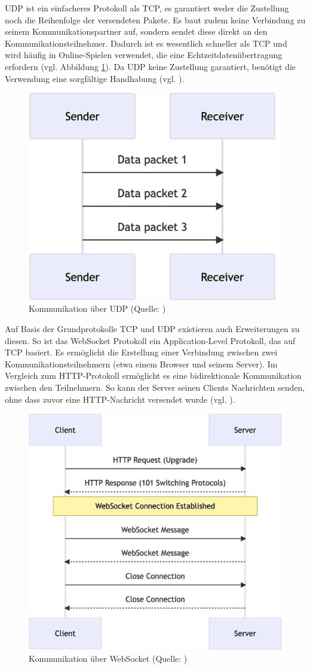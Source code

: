 \ac{UDP} ist ein einfacheres Protokoll als \ac{TCP}, es garantiert weder die Zustellung noch die Reihenfolge der versendeten Pakete. Es baut zudem keine Verbindung zu seinem Kommunikationspartner auf, sondern sendet diese direkt an den Kommunikationsteilnehmer. Dadurch ist es wesentlich schneller als \ac{TCP} und wird häufig in Online-Spielen verwendet, die eine Echtzeitdatenübertragung erfordern (vgl. Abbildung \ref{fig:udp}). Da \ac{UDP} keine Zustellung garantiert, benötigt die Verwendung eine sorgfältige Handhabung (vgl. \cite{mygames_unity_2024}).

\begin{figure}[ht]
\centering
\includegraphics[width=0.5\linewidth]{content/pictures/UDP-Network.png}
\caption{Kommunikation über UDP (Quelle: \cite{mygames_unity_2024})}
\label{fig:udp}
\end{figure}

Auf Basis der Grundprotokolle \ac{TCP} und \ac{UDP} existieren auch Erweiterungen zu diesen. So ist das WebSocket Protokoll ein Application-Level Protokoll, das auf \ac{TCP} basiert. Es ermöglicht die Erstellung einer Verbindung zwischen zwei Kommunikationsteilnehmern (etwa einem Browser und seinem Server). Im Vergleich zum \ac{HTTP}-Protokoll ermöglicht es eine bidirektionale Kommunikation zwischen den Teilnehmern. So kann der Server seinen Clients Nachrichten senden, ohne dass zuvor eine \ac{HTTP}-Nachricht versendet wurde (vgl. \cite{mygames_unity_2024}).

\begin{figure}[ht]
\centering
\includegraphics[width=0.5\linewidth]{content/pictures/WebSocket-Network.png}
\caption{Kommunikation über WebSocket (Quelle: \cite{mygames_unity_2024})}
\label{fig:ws}
\end{figure}

